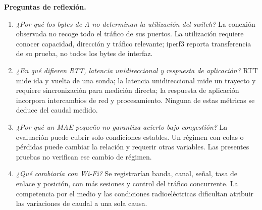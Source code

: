 \documentclass[11pt,letterpaper]{article}
\begin{document}
\textbf{Preguntas de reflexión.}
\begin{enumerate}
\item \emph{¿Por qué los bytes de A no determinan la utilización del switch?} La conexión observada no recoge todo el tráfico de sus puertos. La utilización requiere conocer capacidad, dirección y tráfico relevante; iperf3 reporta transferencia de su prueba, no todos los bytes de interfaz.
\item \emph{¿En qué difieren RTT, latencia unidireccional y respuesta de aplicación?} RTT mide ida y vuelta de una sonda; la latencia unidireccional mide un trayecto y requiere sincronización para medición directa; la respuesta de aplicación incorpora intercambios de red y procesamiento. Ninguna de estas métricas se deduce del caudal medido.
\item \emph{¿Por qué un MAE pequeño no garantiza acierto bajo congestión?} La evaluación puede cubrir solo condiciones estables. Un régimen con colas o pérdidas puede cambiar la relación y requerir otras variables. Las presentes pruebas no verifican ese cambio de régimen.
\item \emph{¿Qué cambiaría con Wi-Fi?} Se registrarían banda, canal, señal, tasa de enlace y posición, con más sesiones y control del tráfico concurrente. La competencia por el medio y las condiciones radioeléctricas dificultan atribuir las variaciones de caudal a una sola causa.
\end{enumerate}
\end{document}
